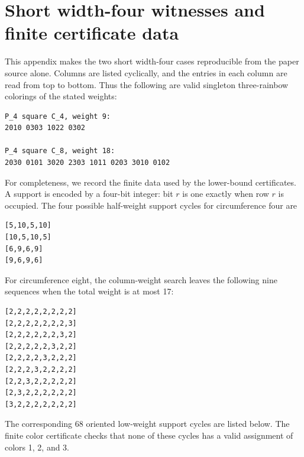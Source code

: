 \section{Short width-four witnesses and finite certificate data}\label{app:width-four-certificates}

This appendix makes the two short width-four cases reproducible from the
paper source alone. Columns are listed cyclically, and the entries in each
column are read from top to bottom. Thus the following are valid singleton
three-rainbow colorings of the stated weights:

\noindent\begin{minipage}{\linewidth}
\begin{verbatim}
P_4 square C_4, weight 9:
2010 0303 1022 0302

P_4 square C_8, weight 18:
2030 0101 3020 2303 1011 0203 3010 0102
\end{verbatim}
\end{minipage}\par\medskip

For completeness, we record the finite data used by the lower-bound
certificates. A support is encoded by a four-bit integer: bit $r$ is one
exactly when row $r$ is occupied. The four possible half-weight support
cycles for circumference four are

\begin{verbatim}
[5,10,5,10]
[10,5,10,5]
[6,9,6,9]
[9,6,9,6]
\end{verbatim}

For circumference eight, the column-weight search leaves the following nine
sequences when the total weight is at most 17:

\begin{verbatim}
[2,2,2,2,2,2,2,2]
[2,2,2,2,2,2,2,3]
[2,2,2,2,2,2,3,2]
[2,2,2,2,2,3,2,2]
[2,2,2,2,3,2,2,2]
[2,2,2,3,2,2,2,2]
[2,2,3,2,2,2,2,2]
[2,3,2,2,2,2,2,2]
[3,2,2,2,2,2,2,2]
\end{verbatim}

The corresponding 68 oriented low-weight support cycles are listed below.
The finite color certificate checks that none of these cycles has a valid
assignment of colors 1, 2, and 3.

